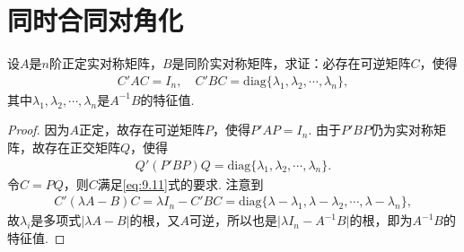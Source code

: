 \documentclass[../../main.tex]{subfiles}
\begin{document}
\section{同时合同对角化}

\begin{proposition}[同时合同对角化]\label{proposition:例9.75}
设\(A\)是\(n\)阶正定实对称矩阵，\(B\)是同阶实对称矩阵，求证：必存在可逆矩阵\(C\)，使得
\begin{align}
C'AC = I_n,\quad C'BC = \mathrm{diag}\{\lambda_1,\lambda_2,\cdots,\lambda_n\},\label{eq:9.11}
\end{align}
其中\(\lambda_1,\lambda_2,\cdots,\lambda_n\)是\(A^{-1}B\)的特征值.
\end{proposition}
\begin{proof}
因为\(A\)正定，故存在可逆矩阵\(P\)，使得\(P'AP = I_n\). 由于\(P'BP\)仍为实对称矩阵，故存在正交矩阵\(Q\)，使得
\begin{align*}
Q'(P'BP)Q = \mathrm{diag}\{\lambda_1,\lambda_2,\cdots,\lambda_n\}.
\end{align*}
令\(C = PQ\)，则\(C\)满足\eqref{eq:9.11}式的要求. 注意到
\begin{align*}
C'(\lambda A - B)C=\lambda I_n - C'BC = \mathrm{diag}\{\lambda - \lambda_1,\lambda - \lambda_2,\cdots,\lambda - \lambda_n\},
\end{align*}
故\(\lambda_i\)是多项式\(\vert\lambda A - B\vert\)的根，又\(A\)可逆，所以也是\(\vert\lambda I_n - A^{-1}B\vert\)的根，即为\(A^{-1}B\)的特征值. 
\end{proof}
\end{document}

